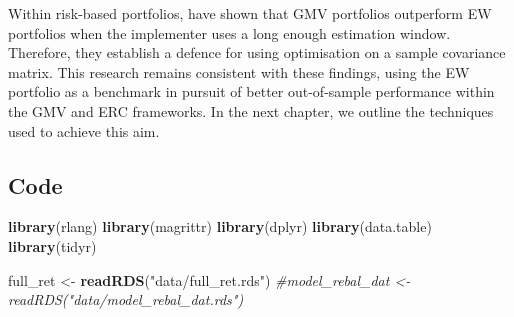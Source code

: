 \documentclass[
]{article}
\newenvironment{Shaded}{\begin{snugshade}}{\end{snugshade}}
\newcommand{\CommentTok}[1]{\textcolor[rgb]{0.56,0.35,0.01}{\textit{#1}}}
\newcommand{\KeywordTok}[1]{\textcolor[rgb]{0.13,0.29,0.53}{\textbf{#1}}}
\newcommand{\NormalTok}[1]{#1}
\newcommand{\StringTok}[1]{\textcolor[rgb]{0.31,0.60,0.02}{#1}}
\begin{document}
Within risk-based portfolios, \citet{K10} have shown that GMV portfolios outperform EW portfolios when the
implementer uses a long enough estimation window. Therefore, they establish a defence for using
optimisation on a sample covariance matrix. This research remains consistent with these findings,
using the EW portfolio as a benchmark in pursuit of better out-of-sample performance within the GMV
and ERC frameworks. In the next chapter, we outline the techniques used to achieve this aim.

\hypertarget{code}{%
\subsection{Code}\label{code}}

\begin{Shaded}
\begin{Highlighting}[]
\KeywordTok{library}\NormalTok{(rlang)}
\KeywordTok{library}\NormalTok{(magrittr)}
\KeywordTok{library}\NormalTok{(dplyr)}
\KeywordTok{library}\NormalTok{(data.table)}
\KeywordTok{library}\NormalTok{(tidyr)}

\NormalTok{full\_ret \textless{}{-}}\StringTok{ }\KeywordTok{readRDS}\NormalTok{(}\StringTok{"data/full\_ret.rds"}\NormalTok{)}
\CommentTok{\#model\_rebal\_dat \textless{}{-} readRDS("data/model\_rebal\_dat.rds")}


\end{Highlighting}
\end{Shaded}
\end{document}
